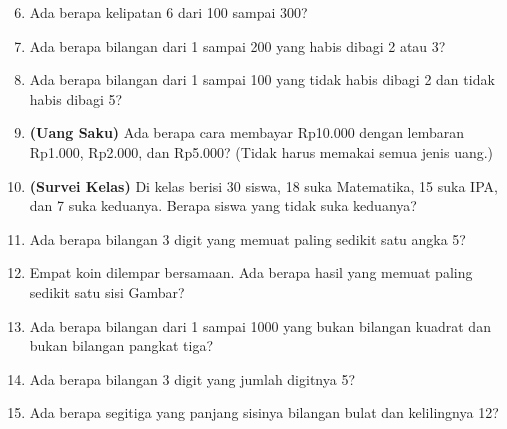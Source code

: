 \documentclass[11pt,a4paper]{article}
\begin{document}
\begin{enumerate}
  \setcounter{enumi}{5}
  \item Ada berapa kelipatan 6 dari 100 sampai 300?
  \item Ada berapa bilangan dari 1 sampai 200 yang habis dibagi 2 atau 3?
  \item Ada berapa bilangan dari 1 sampai 100 yang tidak habis dibagi 2 dan tidak habis dibagi 5?
  \item \textbf{(Uang Saku)} Ada berapa cara membayar Rp10.000 dengan lembaran Rp1.000, Rp2.000,
        dan Rp5.000? (Tidak harus memakai semua jenis uang.)
  \item \textbf{(Survei Kelas)} Di kelas berisi 30 siswa, 18 suka Matematika, 15 suka IPA, dan
        7 suka keduanya. Berapa siswa yang tidak suka keduanya?
\end{enumerate}

\begin{enumerate}
  \setcounter{enumi}{10}
  \item Ada berapa bilangan 3 digit yang memuat paling sedikit satu angka 5?
  \item Empat koin dilempar bersamaan. Ada berapa hasil yang memuat paling sedikit satu sisi Gambar?
  \item Ada berapa bilangan dari 1 sampai 1000 yang bukan bilangan kuadrat dan bukan bilangan
        pangkat tiga?
  \item Ada berapa bilangan 3 digit yang jumlah digitnya 5?
  \item Ada berapa segitiga yang panjang sisinya bilangan bulat dan kelilingnya 12?
\end{enumerate}
\end{document}
